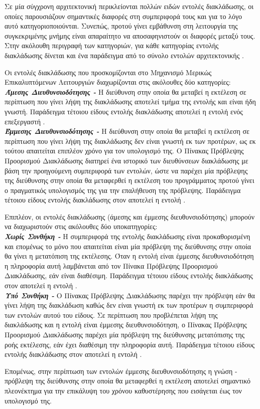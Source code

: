 Σε μία σύγχρονη αρχιτεκτονική περικλείονται πολλών ειδών εντολές διακλάδωσης, οι οποίες παρουσιάζουν σημαντικές διαφορές στη συμπεριφορά τους και για το λόγο αυτό κατηγοριοποιούνται. Συνεπώς, προτού γίνει εμβάθυνση στη λειτουργία της συγκεκριμένης μνήμης είναι απαραίτητο να αποσαφηνιστούν οι διαφορές μεταξύ τους. Στην ακόλουθη περιγραφή των κατηγοριών, για κάθε κατηγορίας εντολής διακλάδωσης δίνεται και ένα παράδειγμα από το σύνολο εντολών αρχιτεκτονικής  \cite{price1995mips}.
\par
Οι εντολές διακλάδωσης που προσκομίζονται στο Μηχανισμό Μερικώς Επικαλυπτόμενων Λειτουργιών διαχωρίζονται στις ακόλουθες δύο κατηγορίες:\\
\indent\textbf{\textit{Άμεσης Διευθυνσιοδότησης -}} Η διεύθυνση στην οποία θα μεταβεί η εκτέλεση σε περίπτωση που γίνει λήψη της διακλάδωσης αποτελεί τμήμα της εντολής και είναι ήδη γνωστή. Παράδειγμα τέτοιου είδους εντολής διακλάδωσης αποτελεί η εντολή  ενός επεξεργαστή .\\
\indent\textbf{\textit{Έμμεσης Διευθυνσιοδότησης -}} Η διεύθυνση στην οποία θα μεταβεί η εκτέλεση σε περίπτωση που γίνει λήψη της διακλάδωσης δεν είναι γνωστή εκ των προτέρων, ως εκ τούτου απαιτείται επιπλέον χρόνο για τον υπολογισμό της. Ο Πίνακας Πρόβλεψης Προορισμού Διακλάδωσης διατηρεί ένα ιστορικό των διευθύνσεων διακλάδωσης με βάση την προηγούμενη συμπεριφορά των εντολών, ώστε να παρέχει μία πρόβλεψης της διεύθυνσης στην οποία θα μεταφερθεί η εκτέλεση του προγράμματος προτού γίνει ο πραγματικός υπολογισμός της για την επαλήθευση της πρόβλεψης. Παράδειγμα τέτοιου είδους εντολής διακλάδωσης στον  αποτελεί η εντολή .
\par
Επιπλέον, οι εντολές διακλάδωσης (άμεσης και έμμεσης διευθυνσιοδότησης) μπορούν να διαχωριστούν στις ακόλουθες δύο υποκατηγορίες:\\
\indent\textbf{\textit{Χωρίς Συνθήκη -}} Η συμπεριφορά της εντολής διακλάδωσης είναι προκαθορισμένη και επομένως το μόνο που απαιτείται είναι μία πρόβλεψη της διεύθυνσης στην οποία θα γίνει η μετατόπιση της εκτέλεσης. Όταν η εντολή είναι έμμεσης διευθυνσιοδότηση η πληροφορία αυτή λαμβάνεται από τον Πίνακα Πρόβλεψης Προορισμού Διακλάδωσης, εάν είναι διαθέσιμη. Παράδειγμα τέτοιου είδους εντολής διακλάδωσης στον  αποτελεί η εντολή .\\
\indent\textbf{\textit{Υπό Συνθήκη -}} Ο Πίνακας Πρόβλεψης Διακλάδωσης παρέχει την πρόβλεψη εάν θα γίνει λήψη της διακλάδωση καθώς δεν είναι γνωστή εκ των προτέρων η συμπεριφορά των εντολών αυτού του είδους. Σε περίπτωση που προβλέπεται λήψη της διακλάδωσης και η εντολή είναι έμμεσης διευθυνσιοδότηση, ο Πίνακας Πρόβλεψης Προορισμού Διακλάδωσης παρέχει μία πρόβλεψη της διεύθυνσης μετατόπισης της ροής εκτέλεσης, εάν έχει διαθέσιμη την πληροφορία αυτή. Παράδειγμα τέτοιου είδους εντολής διακλάδωσης στον  αποτελεί η εντολή .
\par
Επομένως, στην περίπτωση των εντολών έμμεσης διευθυνσιοδότησης η γνώση - πρόβλεψη της διεύθυνσης στην οποία θα μεταφερθεί η εκτέλεση αποτελεί σημαντικό πλεονέκτημα για την επικάλυψη του χρόνου καθυστέρησης που εισάγεται έως τον υπολογισμό της.

